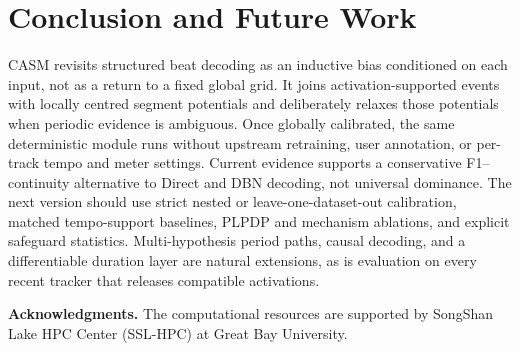 \documentclass{article}
\begin{document}
\section{Conclusion and Future Work}
\label{sec:concl}

CASM revisits structured beat decoding as an inductive bias conditioned on each input, not as a return to a fixed global grid. It joins activation-supported events with locally centred segment potentials and deliberately relaxes those potentials when periodic evidence is ambiguous. Once globally calibrated, the same deterministic module runs without upstream retraining, user annotation, or per-track tempo and meter settings. Current evidence supports a conservative F1--continuity alternative to Direct and DBN decoding, not universal dominance. The next version should use strict nested or leave-one-dataset-out calibration, matched tempo-support baselines, PLPDP and mechanism ablations, and explicit safeguard statistics. Multi-hypothesis period paths, causal decoding, and a differentiable duration layer are natural extensions, as is evaluation on every recent tracker that releases compatible activations.

\textbf{Acknowledgments.}
The computational resources are supported by SongShan Lake HPC
Center (SSL-HPC) at Great Bay University.



\end{document}
